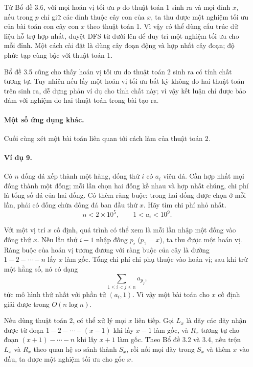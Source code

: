 \documentclass[11pt]{article}
\begin{document}
Từ Bổ đề 3.6, với mọi hoán vị tối ưu $p$ do thuật toán 1 sinh ra và mọi đỉnh
$x$, nếu trong $p$ chỉ giữ các đỉnh thuộc cây con của $x$, ta thu được một
nghiệm tối ưu của bài toán con cây con $x$ theo thuật toán 1. Vì vậy có thể dùng
cấu trúc dữ liệu hỗ trợ hợp nhất, duyệt DFS từ dưới lên để duy trì một nghiệm
tối ưu cho mỗi đỉnh. Một cách cài đặt là dùng cây đoạn động và hợp nhất cây
đoạn; độ phức tạp cùng bậc với thuật toán 1.

Bổ đề 3.5 cũng cho thấy hoán vị tối ưu do thuật toán 2 sinh ra có tính chất
tương tự. Tuy nhiên nếu lấy một hoán vị tối ưu bất kỳ không do hai thuật toán
trên sinh ra, dễ dựng phản ví dụ cho tính chất này; vì vậy kết luận chỉ được
bảo đảm với nghiệm do hai thuật toán trong bài tạo ra.

\paragraph{Một số ứng dụng khác.}
Cuối cùng xét một bài toán liên quan tới cách làm của thuật toán 2.

\paragraph{Ví dụ 9.}
Có $n$ đống đá xếp thành một hàng, đống thứ $i$ có $a_i$ viên đá. Cần hợp nhất
mọi đống thành một đống; mỗi lần chọn hai đống kề nhau và hợp nhất chúng, chi
phí là tổng số đá của hai đống. Có thêm ràng buộc: trong hai đống được chọn ở
mỗi lần, phải có đống chứa đống đá ban đầu thứ $x$. Hãy tìm chi phí nhỏ nhất.
\[
  n<2\times 10^5,\qquad 1<a_i<10^9.
\]

Với một vị trí $x$ cố định, quá trình có thể xem là mỗi lần nhập một đống vào
đống thứ $x$. Nếu lần thứ $i-1$ nhập đống $p_i$ ($p_1=x$), ta thu được một hoán
vị. Ràng buộc của hoán vị tương đương với ràng buộc của cây là đường
$1-2-\cdots-n$ lấy $x$ làm gốc. Tổng chi phí chỉ phụ thuộc vào hoán vị; sau khi
trừ một hằng số, nó có dạng
\[
  \sum_{1\le i<j\le n} a_{p_j},
\]
tức mô hình thứ nhất với phần tử $(a_i,1)$. Vì vậy một bài toán cho $x$ cố định
giải được trong $O(n\log n)$.

Nếu dùng thuật toán 2, có thể xử lý mọi $x$ liên tiếp. Gọi $L_x$ là dãy các dãy
nhận được từ đoạn $1-2-\cdots-(x-1)$ khi lấy $x-1$ làm gốc, và $R_x$ tương tự
cho đoạn $(x+1)-\cdots-n$ khi lấy $x+1$ làm gốc. Theo Bổ đề 3.2 và 3.4, nếu
trộn $L_x$ và $R_x$ theo quan hệ so sánh thành $S_x$, rồi nối mọi dãy trong
$S_x$ và thêm $x$ vào đầu, ta được một nghiệm tối ưu cho gốc $x$.
\end{document}
